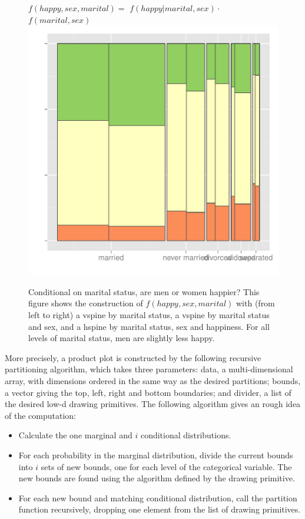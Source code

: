 \documentclass[journal]{vgtc}
\begin{document}
\begin{figure}[htbp]
\begin{minipage}[b]{0.3\linewidth}
\end{minipage} 
\begin{minipage}[b]{0.3\linewidth}
$f(happy, sex, marital) =$
$f(happy|marital, sex) \cdot $
$f(marital, sex)$
      \includegraphics[width=\linewidth]{part-comb-3}
\end{minipage}
  \caption{Conditional on marital status, are men or women happier?  This figure shows the construction of $f(happy, sex, marital)$ with (from left to right) a vspine by marital status, a vspine by marital status and sex, and a hspine by marital status, sex and happiness.  For all levels of marital status, men are slightly less happy.}
  \label{fig:recursive}
\end{figure}

   
More precisely, a product plot is constructed by the following recursive partitioning algorithm, which takes three parameters: {\sf data}, a multi-dimensional array, with dimensions ordered in the same way as the desired partitions; {\sf bounds}, a vector giving the top, left, right and bottom boundaries; and {\sf divider}, a list of the desired low-d drawing primitives. The following algorithm gives an rough idea of the computation:

\begin{itemize}
  \item Calculate the one marginal and $i$ conditional distributions.

  \item For each probability in the marginal distribution, divide the current bounds into $i$ sets of new bounds, one for each level of the categorical variable. The new bounds are found using the algorithm defined by the drawing primitive.

  \item For each new bound and matching conditional distribution, call the partition function recursively, dropping one element from the list of drawing primitives.

\end{itemize}
\end{document}
